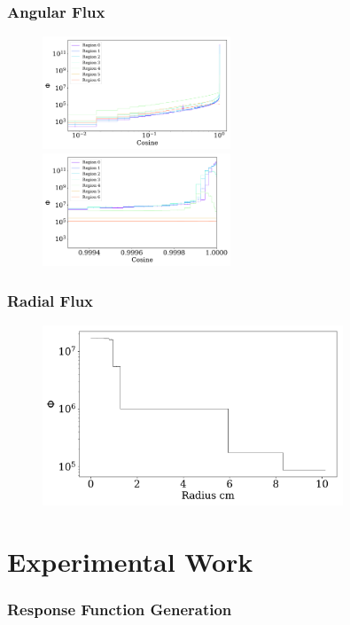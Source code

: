 \documentclass[fleqn]{beamer}
\begin{document}
\begin{frame}
\frametitle{Angular Flux}

\begin{figure}
\centering
\includegraphics[width = 0.5\textwidth]{flux_rad_cos}
\includegraphics[width = 0.5\textwidth]{flux_rad_cos_detail}
\caption{}
\end{figure}

\end{frame}

\begin{frame}
\frametitle{Radial Flux}

\begin{figure}
\centering
\includegraphics[width = 0.8\textwidth]{flux_rad}
\caption{}
\end{figure}

\end{frame}

\section{Experimental Work}
\begin{frame}
\frametitle{Response Function Generation}

\end{frame}
\end{document}

